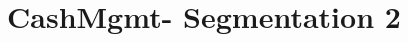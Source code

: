 \documentclass{article}
\begin{document}
\thispagestyle{empty}
\printtitle									%
  	\vfill
\printauthor
\newpage

\tableofcontents
\thispagestyle{empty}
\newpage

% 
% 	
% 	

\def\BU{CashMgmt}
\def\SegmentTwo{2}
\newcommand\SegmentsTwoComponent{GlobalPaymentExFX, USDWire, International,
APAC, EMEA, LATAM, Domestic, NORAM, NONTS, NonUSDWire}

\section{\BU - Segmentation 2}
	
	
\CleanUp
\end{document}

